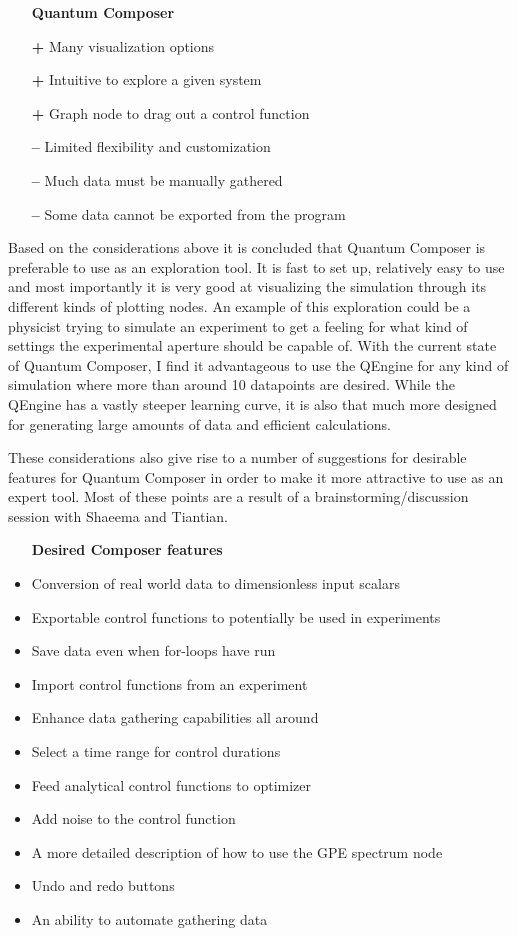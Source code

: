 \documentclass[a4paper, twocolumn]{revtex4-1}
\begin{document}
\begin{itemize}
	\item[] \textbf{Quantum Composer} 
	\item[\bf+] Many visualization options
	\item[\bf+] Intuitive to explore a given system
	\item[\bf+] Graph node to drag out a control function
	\item[\bf{--}] Limited flexibility and customization
	\item[\bf{--}] Much data must be manually gathered
	\item[\bf{--}] Some data cannot be exported from the program
\end{itemize}

Based on the considerations above it is concluded that Quantum Composer is preferable to use as an exploration tool. It is fast to set up, relatively easy to use and most importantly it is very good at visualizing the simulation through its different kinds of plotting nodes. An example of this exploration could be a physicist trying to simulate an experiment to get a feeling for what kind of settings the experimental aperture should be capable of. With the current state of Quantum Composer, I find it advantageous to use the QEngine for any kind of simulation where more than around 10 datapoints are desired. While the QEngine has a vastly steeper learning curve, it is also that much more designed for generating large amounts of data and efficient calculations. 

These considerations also give rise to a number of suggestions for desirable features for Quantum Composer in order to make it more attractive to use as an expert tool. Most of these points are a result of a brainstorming/discussion session with Shaeema and Tiantian.

\begin{itemize}
	\item[] \textbf{Desired Composer features} 
	\item Conversion of real world data to dimensionless input scalars
	\item Exportable control functions to potentially be used in experiments
	\item Save data even when for-loops have run
	\item Import control functions from an experiment
	\item Enhance data gathering capabilities all around
	\item Select a time range for control durations
	\item Feed analytical control functions to  optimizer
	\item Add noise to the control function
	\item A more detailed description of how to use the GPE spectrum node
	\item Undo and redo buttons
	\item An ability to automate gathering data
\end{itemize}
\end{document}
